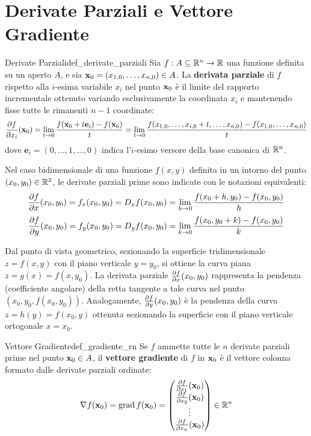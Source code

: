 \section{Derivate Parziali e Vettore Gradiente}

\begin{definizione}{Derivate Parziali}{def_derivate_parziali}
Sia $f: A \subseteq \mathbb{R}^n \to \mathbb{R}$ una funzione definita su un aperto $A$, e sia $\mathbf{x}_0 = (x_{1,0}, \dots, x_{n,0}) \in A$. La \textbf{derivata parziale} di $f$ rispetto alla $i$-esima variabile $x_i$ nel punto $\mathbf{x}_0$ è il limite del rapporto incrementale ottenuto variando esclusivamente la coordinata $x_i$ e mantenendo fisse tutte le rimanenti $n-1$ coordinate:
\[
\frac{\partial f}{\partial x_i}(\mathbf{x}_0) = \lim_{t \to 0} \frac{f(\mathbf{x}_0 + t \mathbf{e}_i) - f(\mathbf{x}_0)}{t} = \lim_{t \to 0} \frac{f(x_{1,0}, \dots, x_{i,0}+t, \dots, x_{n,0}) - f(x_{1,0}, \dots, x_{n,0})}{t}
\]
dove $\mathbf{e}_i = (0, \dots, 1, \dots, 0)$ indica l'$i$-esimo versore della base canonica di $\mathbb{R}^n$.
\end{definizione}

Nel caso bidimensionale di una funzione $f(x,y)$ definita in un intorno del punto $(x_0, y_0) \in \mathbb{R}^2$, le derivate parziali prime sono indicate con le notazioni equivalenti:
\[
\frac{\partial f}{\partial x}(x_0, y_0) = f_x(x_0, y_0) = D_x f(x_0, y_0) = \lim_{h \to 0} \frac{f(x_0 + h, y_0) - f(x_0, y_0)}{h}
\]
\[
\frac{\partial f}{\partial y}(x_0, y_0) = f_y(x_0, y_0) = D_y f(x_0, y_0) = \lim_{k \to 0} \frac{f(x_0, y_0 + k) - f(x_0, y_0)}{k}
\]

\begin{osservazione}
Dal punto di vista geometrico, sezionando la superficie tridimensionale $z = f(x,y)$ con il piano verticale $y = y_0$, si ottiene la curva piana $z = g(x) = f(x, y_0)$. La derivata parziale $\frac{\partial f}{\partial x}(x_0, y_0)$ rappresenta la pendenza (coefficiente angolare) della retta tangente a tale curva nel punto $(x_0, y_0, f(x_0, y_0))$.
Analogamente, $\frac{\partial f}{\partial y}(x_0, y_0)$ è la pendenza della curva $z = h(y) = f(x_0, y)$ ottenuta sezionando la superficie con il piano verticale ortogonale $x = x_0$.
\end{osservazione}

\begin{definizione}{Vettore Gradiente}{def_gradiente_rn}
Se $f$ ammette tutte le $n$ derivate parziali prime nel punto $\mathbf{x}_0 \in A$, il \textbf{vettore gradiente} di $f$ in $\mathbf{x}_0$ è il vettore colonna formato dalle derivate parziali ordinate:
\[
\nabla f(\mathbf{x}_0) = \operatorname{grad} f(\mathbf{x}_0) = \begin{pmatrix} \frac{\partial f}{\partial x_1}(\mathbf{x}_0) \\ \frac{\partial f}{\partial x_2}(\mathbf{x}_0) \\ \vdots \\ \frac{\partial f}{\partial x_n}(\mathbf{x}_0) \end{pmatrix} \in \mathbb{R}^n
\]
\end{definizione}

